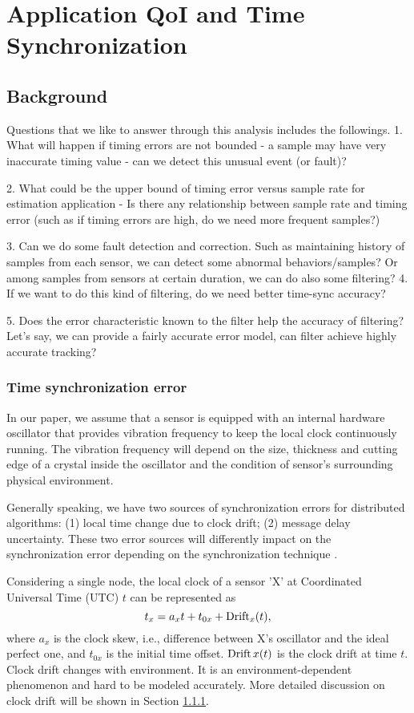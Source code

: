 \section{Application QoI and Time Synchronization}

\subsection{Background}
 Questions that we like to answer
through this analysis includes the followings. 1.  What will happen
if timing errors are not bounded - a sample may have very inaccurate
timing value - can we detect this unusual event (or fault)?

2.  What could be the upper bound of timing error versus sample rate
for estimation application - Is there any relationship between
sample rate and timing error (such as if timing errors are high, do
we need more frequent samples?)

3.  Can we do some fault detection and correction. Such as
maintaining history of samples from each sensor, we can detect some
abnormal behaviors/samples? Or among samples from sensors at certain
duration, we can do also some filtering? 4.  If we want to do this
kind of filtering, do we need better time-sync accuracy?

5.  Does the error characteristic known to the filter help the
accuracy of filtering? Let's say, we can provide a fairly accurate
error model, can filter achieve highly accurate tracking?

\subsubsection{Time synchronization error}
 In our paper, we assume that
a sensor is equipped with an internal hardware oscillator that
provides vibration frequency to keep the local clock continuously
running. The vibration frequency will depend on the size, thickness
and cutting edge of a crystal inside the oscillator and the
condition of sensor's surrounding physical environment.

Generally speaking, we have two sources of synchronization errors
for distributed algorithms: (1) local time change due to clock
drift; (2) message delay uncertainty. These two error sources will
differently impact on the synchronization error depending on
the synchronization technique \cite{wsn-timecali}.

Considering a single node, the local clock of a sensor 'X' at
Coordinated Universal Time (UTC) $t$ can be represented as
\cite{timing-error}
\[t_x = a_xt+ t_{0x} + \operatorname{Drift}_x(t),\]
where $a_x$ is the clock skew, i.e., difference between X's oscillator
and the ideal perfect one, and $t_{0x}$ is the initial time offset.
$\operatorname{Drift} x(t)$ is the clock drift at time $t$. Clock drift changes with
environment. It is an environment-dependent phenomenon and hard to
be modeled accurately. More detailed discussion on clock drift will
be shown in Section \ref{}.

